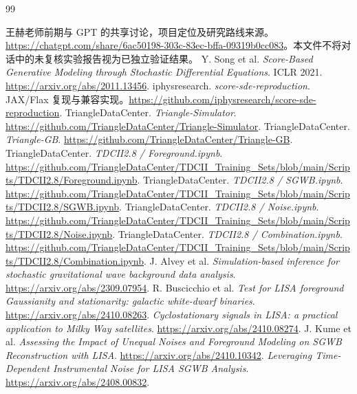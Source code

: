 \documentclass[UTF8,fontset=fandol,a4paper,11pt]{ctexart}
\numberwithin{equation}{section}
\begin{document}
\begin{thebibliography}{99}
 王赫老师前期与 GPT 的共享讨论，项目定位及研究路线来源。\url{https://chatgpt.com/share/6ac50198-303c-83ec-bffa-09319b0cc083}。本文件不将对话中的未复核实验报告视为已独立验证结果。
 Y. Song et al. \textit{Score-Based Generative Modeling through Stochastic Differential Equations}. ICLR 2021. \url{https://arxiv.org/abs/2011.13456}.
 iphysresearch. \textit{score-sde-reproduction}. JAX/Flax 复现与兼容实现。\url{https://github.com/iphysresearch/score-sde-reproduction}.
 TriangleDataCenter. \textit{Triangle-Simulator}. \url{https://github.com/TriangleDataCenter/Triangle-Simulator}.
 TriangleDataCenter. \textit{Triangle-GB}. \url{https://github.com/TriangleDataCenter/Triangle-GB}.
 TriangleDataCenter. \textit{TDCII2.8 / Foreground.ipynb}. \url{https://github.com/TriangleDataCenter/TDCII_Training_Sets/blob/main/Scripts/TDCII2.8/Foreground.ipynb}.
 TriangleDataCenter. \textit{TDCII2.8 / SGWB.ipynb}. \url{https://github.com/TriangleDataCenter/TDCII_Training_Sets/blob/main/Scripts/TDCII2.8/SGWB.ipynb}.
 TriangleDataCenter. \textit{TDCII2.8 / Noise.ipynb}. \url{https://github.com/TriangleDataCenter/TDCII_Training_Sets/blob/main/Scripts/TDCII2.8/Noise.ipynb}.
 TriangleDataCenter. \textit{TDCII2.8 / Combination.ipynb}. \url{https://github.com/TriangleDataCenter/TDCII_Training_Sets/blob/main/Scripts/TDCII2.8/Combination.ipynb}.
 J. Alvey et al. \textit{Simulation-based inference for stochastic gravitational wave background data analysis}. \url{https://arxiv.org/abs/2309.07954}.
 R. Buscicchio et al. \textit{Test for LISA foreground Gaussianity and stationarity: galactic white-dwarf binaries}. \url{https://arxiv.org/abs/2410.08263}.
 \textit{Cyclostationary signals in LISA: a practical application to Milky Way satellites}. \url{https://arxiv.org/abs/2410.08274}.
 J. Kume et al. \textit{Assessing the Impact of Unequal Noises and Foreground Modeling on SGWB Reconstruction with LISA}. \url{https://arxiv.org/abs/2410.10342}.
 \textit{Leveraging Time-Dependent Instrumental Noise for LISA SGWB Analysis}. \url{https://arxiv.org/abs/2408.00832}.
\end{thebibliography}
\end{document}
